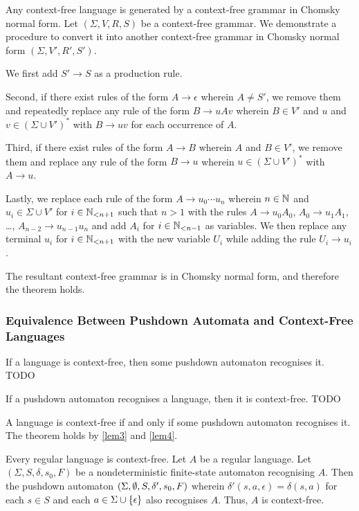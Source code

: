 \Bth
    Any context-free language is generated by a context-free grammar in Chomsky
    normal form.
\Eth
\Bpr
    Let \((\Sigma, V, R, S)\) be a context-free grammar. We demonstrate a
    procedure to convert it into another context-free grammar in Chomsky normal
    form \((\Sigma, V', R', S')\).

    We first add \(S' \to S\) as a production rule.

    Second, if there exist rules of the form \(A \to \epsilon\) wherein \(A \neq
    S'\), we remove them and repeatedly replace any rule of the form \(B \to u A
    v\) wherein \(B \in V'\) and \(u\) and \(v \in (\Sigma \cup V')^*\) with \(B
    \to u v\) for each occurrence of \(A\).

    Third, if there exist rules of the form \(A \to B\) wherein \(A\) and \(B
    \in V'\), we remove them and replace any rule of the form \(B \to u\)
    wherein \(u \in (\Sigma \cup V')^*\) with \(A \to u\).

    Lastly, we replace each rule of the form \(A \to u_0 \cdots u_n\) wherein
    \(n \in \setnat\) and \(u_i \in \Sigma \cup V'\) for \(i \in \Nln[n + 1]\)
    such that \(n > 1\) with the rules \(A \to u_0 A_0\), \(A_0 \to u_1 A_1\),
    \ldots, \(A_{n - 2} \to u_{n - 1} u_n\) and add \(A_i\) for \(i \in \Nln[n -
    1]\) as variables. We then replace any terminal \(u_i\) for \(i \in \Nln[n +
    1]\) with the new variable \(U_i\) while adding the rule \(U_i \to u_i\).

    The resultant context-free grammar is in Chomsky normal form, and therefore
    the theorem holds.
\Epr

\subsubsection{Equivalence Between Pushdown Automata and Context-Free Languages}

\Blm
    \label{lem3}
    If a language is context-free, then some pushdown automaton recognises it.
\Elm
\Bpr
    TODO
\Epr

\Blm
    \label{lem4}
    If a pushdown automaton recognises a language, then it is context-free.
\Elm
\Bpr
    TODO
\Epr

\Bth
    A language is context-free if and only if some pushdown automaton recognises
    it.
\Eth
\Bpr
    The theorem holds by \autoref{lem3} and \autoref{lem4}.
\Epr

\Bcr
    Every regular language is context-free.
\Ecr
\Bpr
    Let \(A\) be a regular language. Let \((\Sigma, S, \delta, s_0, F)\) be a
    nondeterministic finite-state automaton recognising \(A\). Then the pushdown
    automaton \((\Sigma, \nset, S, \delta', s_0, F)\) wherein \(\delta'(s, a,
    \epsilon) = \delta(s, a)\) for each \(s \in S\) and each \(a \in \Sigma \cup
    \set{\epsilon}\) also recognises \(A\). Thus, \(A\) is context-free.
\Epr

